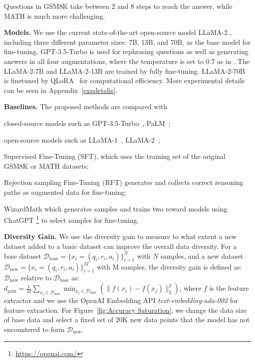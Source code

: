     Questions in GSM8K \citep{cobbe2021training} take between 2 and 8 steps to reach the answer, while MATH is much more challenging.

    \textbf{Models.}
    We use the current state-of-the-art open-source model LLaMA-2 \citep{touvron2023llama}, including three different parameter sizes: 7B, 13B, and 70B, as the base model for fine-tuning. GPT-3.5-Turbo is used for rephrasing questions as well as generating answers in all four augmentations, where the temperature is set to 0.7 as in \cite{wang2023selfconsistency}. The LLaMA-2-7B and LLaMA-2-13B are trained by fully fine-tuning. LLaMA-2-70B is finetuned by QLoRA~\citep{dettmers2023qlora} for computational efficiency. More experimental details can be seen in Appendix~\ref{expdetalis}.

    \textbf{Baselines.}
    The proposed methods are compared with

\begin{enumerate*}[(i), series = tobecont, itemjoin = \quad]
    \item closed-source models such as GPT-3.5-Turbo~\citep{gpt3-5-turbo}, PaLM~\citep{chowdhery2022palm};
    \item open-source models such as LLaMA-1~\citep{touvron2023llama1}, LLaMA-2~\citep{touvron2023llama};
    \item Supervised Fine-Tuning (SFT), which uses the training set of the original GSM8K or MATH datasets;
    \item Rejection sampling Fine-Tuning (RFT) \citep{yuan2023scaling} generates and collects correct reasoning paths as augmented data for fine-tuning; 
    \item WizardMath \citep{luo2023wizardmath} which generates samples and trains two reward models using ChatGPT \footnote{\url{https://openai.com/}} to select samples for fine-tuning. 
    \end{enumerate*}

    \textbf{Diversity Gain.} We use the diversity gain \citep{bilmes2022submodularity} to measure to what extent a new dataset added to a basic dataset can improve the overall data diversity. For a base dataset $\mathcal{D}_{\text{base}}=\{x_i=(q_i, r_i, a_i)\}_{i=1}^N$ with $N$ samples, and a new dataset $\mathcal{D}_{\text{new}}=\{x_i=(q_i, r_i, a_i)\}_{i=1}^M$ with M samples, the diversity gain is defined as: $\mathcal{D}_{\text{new}}$ relative to $\mathcal{D}_{\text{base}}$ as: $d_{\text{gain}}=\frac{1}{M}\sum_{x_{i}\in\mathcal{D}_{\text{new}}}\min_{x_{j}\in\mathcal{D}_{\text{base}}}(\|f(x_{i}) -f(x_{j})\|_2^2)$, where $f$ is the feature extractor and we use the OpenAI Embedding API \textit{text-embedding-ada-002} for feature extraction. For Figure~\ref{fig:Accuracy Saturation}, we change the data size of base data and select a fixed set of 20K new data points that the model has not encountered to form $\mathcal{D}_{\text{new}}$.

